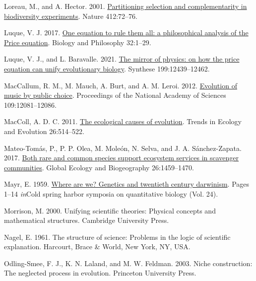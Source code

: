 \documentclass[
]{article}
\newlength{\cslhangindent}
\newlength{\cslentryspacingunit} %
\newenvironment{CSLReferences}[2] %
 {%
  \setlength{\parindent}{0pt}
  \ifodd #1
  \let\oldpar\par
  \def\par{\hangindent=\cslhangindent\oldpar}
  \fi
  \setlength{\parskip}{#2\cslentryspacingunit}
 }%
 {}
\begin{document}
\begin{CSLReferences}{0}{0}
\leavevmode{}%
Loreau, M., and A. Hector. 2001.
\href{https://doi.org/10.1038/35083573}{{Partitioning selection and
complementarity in biodiversity experiments}}. Nature 412:72--76.

\leavevmode{}%
Luque, V. J. 2017. \href{https://doi.org/10.1007/s10539-016-9538-y}{{One
equation to rule them all: a philosophical analysis of the Price
equation}}. Biology and Philosophy 32:1--29.

\leavevmode{}%
Luque, V. J., and L. Baravalle. 2021.
\href{https://doi.org/10.1007/s11229-021-03339-6}{{The mirror of
physics: on how the price equation can unify evolutionary biology}}.
Synthese 199:12439--12462.

\leavevmode{}%
MacCallum, R. M., M. Mauch, A. Burt, and A. M. Leroi. 2012.
\href{https://doi.org/10.5061/dryad.h0228}{{Evolution of music by public
choice}}. Proceedings of the National Academy of Sciences
109:12081--12086.

\leavevmode{}%
MacColl, A. D. C. 2011.
\href{https://doi.org/10.1016/j.tree.2011.06.009}{{The ecological causes
of evolution}}. Trends in Ecology and Evolution 26:514--522.

\leavevmode{}%
Mateo-Tomás, P., P. P. Olea, M. Moleón, N. Selva, and J. A.
Sánchez-Zapata. 2017. \href{https://doi.org/10.1111/geb.12673}{{Both
rare and common species support ecosystem services in scavenger
communities}}. Global Ecology and Biogeography 26:1459--1470.

\leavevmode{}%
Mayr, E. 1959. \href{https://doi.org/10.1101/SQB.1959.024.01.003}{Where
are we? Genetics and twentieth century darwinism}. Pages 1--14
\emph{in}Cold spring harbor symposia on quantitative biology (Vol. 24).

\leavevmode{}%
Morrison, M. 2000. Unifying scientific theories: Physical concepts and
mathematical structures. Cambridge University Press.

\leavevmode{}%
Nagel, E. 1961. The structure of science: Problems in the logic of
scientific explanation. Harcourt, Brace \& World, New York, NY, USA.

\leavevmode{}%
Odling-Smee, F. J., K. N. Laland, and M. W. Feldman. 2003. Niche
construction: The neglected process in evolution. Princeton University
Press.


\end{CSLReferences}
\end{document}
